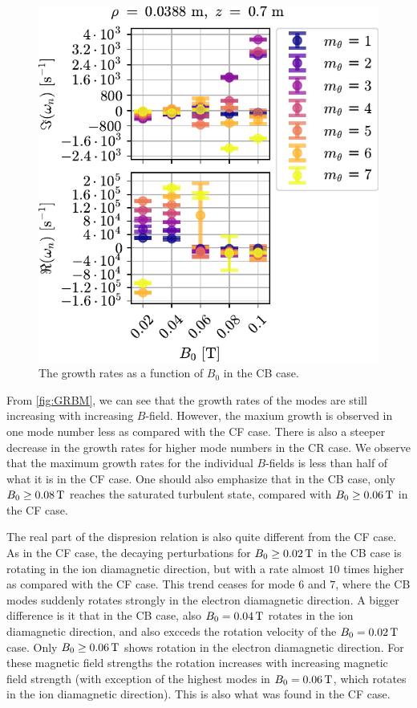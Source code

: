 \begin{figure}[htb]
    \centering
    \includegraphics{fig/results/compareBouss/growthRatesB0ModeNr}
    \caption{The growth rates as a function of $B_0$ in the CB case.}
    \label{fig:GRBB}
\end{figure}
%
From \cref{fig:GRBM}, we can see that the growth rates of the modes are still increasing with increasing $B$-field.
However, the maxium growth is observed in one mode number less as compared with the CF case.
There is also a steeper decrease in the growth rates for higher mode numbers in the CR case.
We observe that the maximum growth rates for the individual $B$-fields is less than half of what it is in the CF case.
One should also emphasize that in the CB case, only $B_0 \geq 0.08\, \text{T}$ reaches the saturated turbulent state, compared with $B_0 \geq 0.06\, \text{T}$ in the CF case.

The real part of the dispresion relation is also quite different from the CF case.
As in the CF case, the decaying perturbations for $B_0 \geq 0.02\, \text{T}$ in the CB case is rotating in the ion diamagnetic direction, but with a rate almost $10$ times higher as compared with the CF case.
This trend ceases for mode $6$ and $7$, where the CB modes suddenly rotates strongly in the electron diamagnetic direction.
A bigger difference is it that in the CB case, also $B_0 = 0.04\, \text{T}$ rotates in the ion diamagnetic direction, and also excceds the rotation velocity of the $B_0 = 0.02\, \text{T}$ case.
Only $B_0 \geq 0.06\, \text{T}$ shows rotation in the electron diamagnetic direction.
For these magnetic field strengths the rotation increases with increasing magnetic field strength (with exception of the highest modes in $B_0 = 0.06\, \text{T}$, which rotates in the ion diamagnetic direction).
This is also what was found in the CF case.

